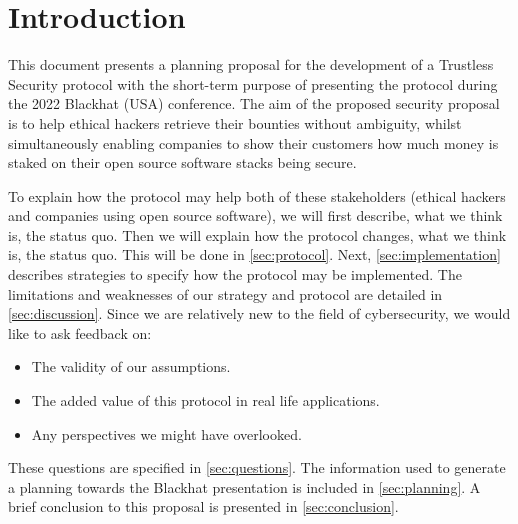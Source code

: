 \section{Introduction}
\label{sec:introduction}
This document presents a planning proposal for the development of a Trustless Security protocol with the short-term purpose of presenting the protocol during the 2022 Blackhat (USA) conference. The aim of the proposed security proposal is to help ethical hackers retrieve their bounties without ambiguity, whilst simultaneously enabling companies to show their customers how much money is staked on their open source software stacks being secure.

To explain how the protocol may help both of these stakeholders (ethical hackers and companies using open source software), we will first describe, what we think is, the status quo. Then we will explain how the protocol changes, what we think is, the status quo. This will be done in \cref{sec:protocol}. Next, \cref{sec:implementation} describes strategies to specify how the protocol may be implemented. The limitations and weaknesses of our strategy and protocol are detailed in \cref{sec:discussion}. Since we are relatively new to the field of cybersecurity, we would like to ask feedback on:
\begin{itemize}
	\item The validity of our assumptions.
	\item The added value of this protocol in real life applications.
	\item Any perspectives we might have overlooked.
\end{itemize}
These questions are specified in \cref{sec:questions}. The information used to generate a planning towards the Blackhat presentation is included in \cref{sec:planning}. A brief conclusion to this proposal is presented in \cref{sec:conclusion}.